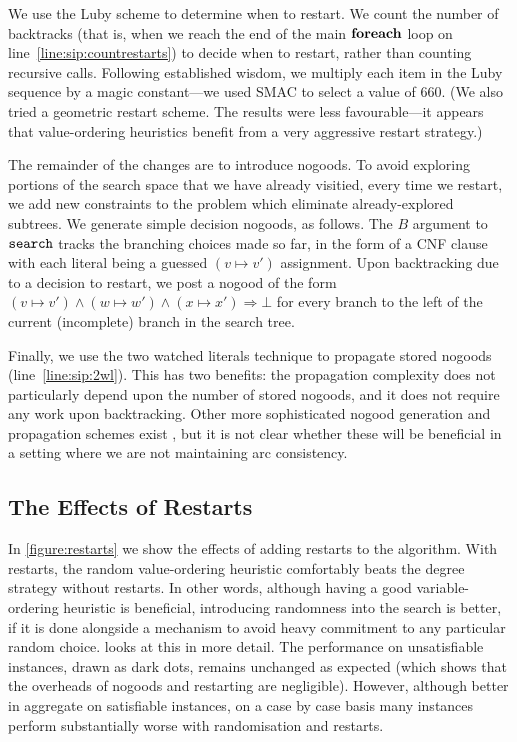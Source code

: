 \documentclass{article}
\newcommand{\citep}[1]{\cite{#1}}
\newcommand{\siplineref}[1]{line~\ref{line:sip:#1}}
\begin{document}
We use the Luby scheme \citep{DBLP:journals/ipl/LubySZ93} to determine when to restart. We count the
number of backtracks (that is, when we reach the end of the main $\KwSty{foreach}$ loop on
\siplineref{countrestarts}) to decide when to restart, rather than counting recursive calls.
Following established wisdom, we multiply each item in the Luby sequence by a magic constant---we
used SMAC \citep{DBLP:conf/lion/HutterHL11} to select a value of 660. (We also tried a geometric
restart scheme. The results were less favourable---it appears that value-ordering heuristics benefit
from a very aggressive restart strategy.)

The remainder of the changes are to introduce nogoods. To avoid exploring portions of the search
space that we have already visitied, every time we restart, we add new constraints to the problem
which eliminate already-explored subtrees. We generate simple decision nogoods, as follows. The $B$
argument to $\FuncSty{search}$ tracks the branching choices made so far, in the form of a CNF clause
with each literal being a guessed $(v \mapsto v')$ assignment. Upon backtracking due to a decision to
restart, we post a nogood of the form $(v \mapsto v') \wedge (w \mapsto w') \wedge (x \mapsto x')
\Rightarrow \bot$ for every branch to the left of the current (incomplete) branch in the search tree.

Finally, we use the two watched literals technique \citep{DBLP:conf/dac/MoskewiczMZZM01} to
propagate stored nogoods (\siplineref{2wl}). This has two benefits: the propagation complexity does
not particularly depend upon the number of stored nogoods, and it does not require any work upon
backtracking.  Other more sophisticated nogood generation and propagation schemes exist
\citep{DBLP:conf/aaai/LeeSZ16,DBLP:conf/cp/GlorianBLLM17}, but it is not clear whether these will be
beneficial in a setting where we are not maintaining arc consistency.

\subsection{The Effects of Restarts}

In \cref{figure:restarts} we show the effects of adding restarts to the algorithm. With restarts,
the random value-ordering heuristic comfortably beats the degree strategy without restarts. In other
words, although having a good variable-ordering heuristic is beneficial, introducing randomness into
the search is better, if it is done alongside a mechanism to avoid heavy commitment to any
particular random choice.  looks at this in more detail. The performance
on unsatisfiable instances, drawn as dark dots, remains unchanged as expected (which shows that the
overheads of nogoods and restarting are negligible). However, although better in aggregate on
satisfiable instances, on a case by case basis many instances perform substantially worse with
randomisation and restarts.
\end{document}
